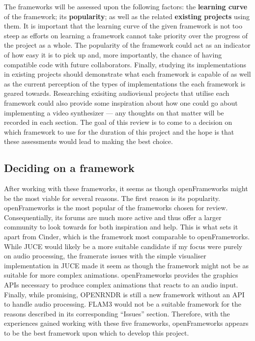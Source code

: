 \documentclass[../initial_thesis.tex]{subfiles}
\begin{document}
The frameworks will be assessed upon the following factors: the \textbf{learning curve} of the framework; its \textbf{popularity}; as well as the related \textbf{existing projects} using them. It is important that the learning curve of the given framework is not too steep as efforts on learning a framework cannot take priority over the progress of the project as a whole. The popularity of the framework could act as an indicator of how easy it is to pick up and, more importantly, the chance of having compatible code with future collaborators. Finally, studying its implementations in existing projects should demonstrate what each framework is capable of as well as the current perception of the types of implementations the each framework is geared towards. Researching exisiting audiovisual projects that utilise each framework could also provide some inspiration about how one could go about implementing a video synthesizer --- any thoughts on that matter will be recorded in each section. The goal of this review is to come to a decision on which framework to use for the duration of this project and the hope is that these assessments would lead to making the best choice.







\subsection{Deciding on a framework}
After working with these frameworks, it seems as though openFrameworks might be the most viable for several reasons. The first reason is its popularity. openFrameworks is the most popular of the frameworks chosen for review. Consequentially, its forums are much more active and thus offer a larger community to look towards for both inspiration and help. This is what sets it apart from Cinder, which is the framework most comparable to openFrameworks. While JUCE would likely be a more suitable candidate if my focus were purely on audio processing, the framerate issues with the simple visualiser implementation in JUCE made it seem as though the framework might not be as suitable for more complex animations. openFrameworks provides the graphics APIs necessary to produce complex animations that reacts to an audio input. Finally, while promising, OPENRNDR is still a new framework without an API to handle audio processing. FLAM3 would not be a suitable framework for the reasons described in its corresponding ``Issues'' section. Therefore, with the experiences gained working with these five frameworks, openFrameworks appears to be the best framework upon which to develop this project.
\end{document}
